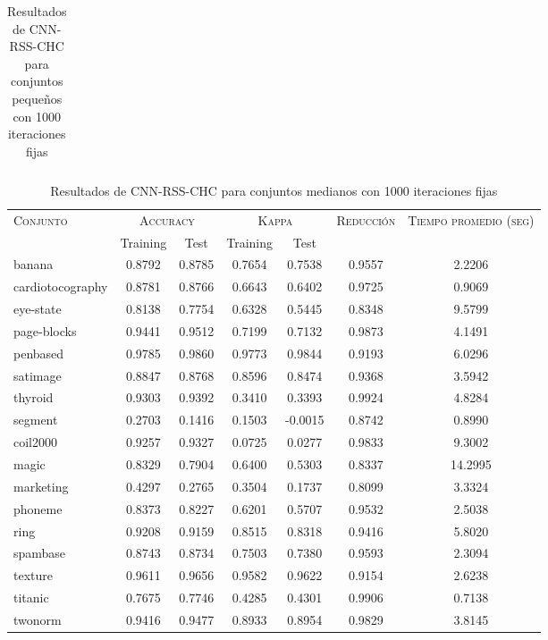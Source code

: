 \begin{table}[]
\begin{tabular}{l c c c c c c}
\hline
\end{tabular}
\caption{Resultados de CNN-RSS-CHC para conjuntos pequeños con 1000 iteraciones fijas}
\label{res-peq-CNN-RSS-CHC}
\end{table}


\begin{table}[]
\centering
\begin{tabular}{l c c c c c c}
\hline
\multirow{2}{*}{\textsc{Conjunto}}
	& \multicolumn{2}{c}{\textsc{Accuracy}}
	& \multicolumn{2}{c}{\textsc{Kappa}}
	& \textsc{Reducción}
	& \textsc{Tiempo promedio (seg)} \\
	& Training & Test
	& Training & Test \\ 
\hline
\hline

banana & 0.8792 & 0.8785 & 0.7654 & 0.7538 & 0.9557 & 2.2206 \\
cardiotocography & 0.8781 & 0.8766 & 0.6643 & 0.6402 & 0.9725 & 0.9069 \\
eye-state & 0.8138 & 0.7754 & 0.6328 & 0.5445 & 0.8348 & 9.5799 \\
page-blocks & 0.9441 & 0.9512 & 0.7199 & 0.7132 & 0.9873 & 4.1491 \\
penbased & 0.9785 & 0.9860 & 0.9773 & 0.9844 & 0.9193 & 6.0296 \\
satimage & 0.8847 & 0.8768 & 0.8596 & 0.8474 & 0.9368 & 3.5942 \\
thyroid & 0.9303 & 0.9392 & 0.3410 & 0.3393 & 0.9924 & 4.8284 \\
segment & 0.2703 & 0.1416 & 0.1503 & -0.0015 & 0.8742 & 0.8990 \\
coil2000 & 0.9257 & 0.9327 & 0.0725 & 0.0277 & 0.9833 & 9.3002 \\
magic & 0.8329 & 0.7904 & 0.6400 & 0.5303 & 0.8337 & 14.2995 \\
marketing & 0.4297 & 0.2765 & 0.3504 & 0.1737 & 0.8099 & 3.3324 \\
phoneme & 0.8373 & 0.8227 & 0.6201 & 0.5707 & 0.9532 & 2.5038 \\
ring & 0.9208 & 0.9159 & 0.8515 & 0.8318 & 0.9416 & 5.8020 \\
spambase & 0.8743 & 0.8734 & 0.7503 & 0.7380 & 0.9593 & 2.3094 \\
texture & 0.9611 & 0.9656 & 0.9582 & 0.9622 & 0.9154 & 2.6238 \\
titanic & 0.7675 & 0.7746 & 0.4285 & 0.4301 & 0.9906 & 0.7138 \\
twonorm & 0.9416 & 0.9477 & 0.8933 & 0.8954 & 0.9829 & 3.8145 \\	

\hline
\end{tabular}
\caption{Resultados de CNN-RSS-CHC para conjuntos medianos con 1000 iteraciones fijas}
\label{res-med-CNN-RSS-CHC}
\end{table}


